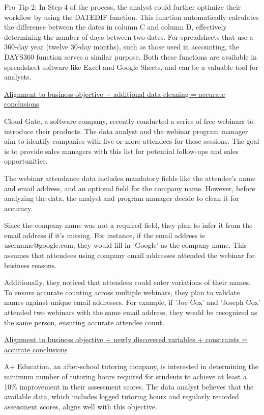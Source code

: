 \documentclass[]{article}
\begin{document}
Pro Tip 2: In Step 4 of the process, the analyst could further optimize their workflow by using the DATEDIF function. This function automatically calculates the difference between the dates in column C and column D, effectively determining the number of days between two dates. For spreadsheets that use a 360-day year (twelve 30-day months), such as those used in accounting, the DAYS360 function serves a similar purpose. Both these functions are available in spreadsheet software like Excel and Google Sheets, and can be a valuable tool for analysts.

\uline{Alignment to business objective + additional data cleaning = accurate conclusions} \par

Cloud Gate, a software company, recently conducted a series of free webinars to introduce their products. The data analyst and the webinar program manager aim to identify companies with five or more attendees for these sessions. The goal is to provide sales managers with this list for potential follow-ups and sales opportunities.

The webinar attendance data includes mandatory fields like the attendee's name and email address, and an optional field for the company name. However, before analyzing the data, the analyst and program manager decide to clean it for accuracy.

Since the company name was not a required field, they plan to infer it from the email address if it's missing. For instance, if the email address is username@google.com, they would fill in 'Google' as the company name. This assumes that attendees using company email addresses attended the webinar for business reasons.

Additionally, they noticed that attendees could enter variations of their names. To ensure accurate counting across multiple webinars, they plan to validate names against unique email addresses. For example, if 'Joe Cox' and 'Joseph Cox' attended two webinars with the same email address, they would be recognized as the same person, ensuring accurate attendee count.

\uline{Alignment to business objective + newly discovered variables + constraints = accurate conclusions} \par
A+ Education, an after-school tutoring company, is interested in determining the minimum number of tutoring hours required for students to achieve at least a 10\% improvement in their assessment scores. The data analyst believes that the available data, which includes logged tutoring hours and regularly recorded assessment scores, aligns well with this objective.
\end{document}
